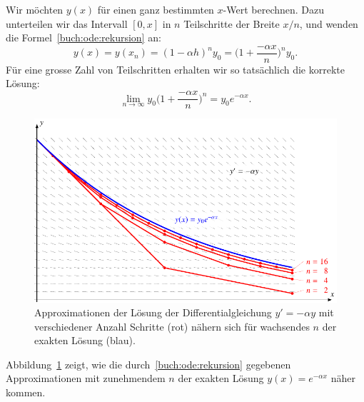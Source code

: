 Wir möchten $y(x)$ für einen ganz bestimmten $x$-Wert berechnen.
Dazu unterteilen wir das Intervall $[0,x]$ in $n$ Teilschritte der
Breite $x/n$, und wenden die Formel~\eqref{buch:ode:rekursion} an:
\[
y(x)=y(x_n)=(1-\alpha h)^n y_0=\biggl(1+\frac{-\alpha x}{n}\biggr)^n y_0.
\]
Für eine grosse Zahl von Teilschritten erhalten wir so tatsächlich die
korrekte Lösung:
\[
\lim_{n\to\infty}y_0\biggl(1+\frac{-\alpha x}n\biggr)^n=y_0 e^{-\alpha x}.
\]
\begin{figure}
\centering
\includegraphics{chapters/50-ode/figures/euler.pdf}
\caption{Approximationen der Lösung der Differentialgleichung $y'=-\alpha y$
mit verschiedener Anzahl Schritte (rot) nähern sich für wachsendes
$n$ der exakten Lösung (blau).
\label{buch:ode:approximation}}
\end{figure}%
Abbildung~\ref{buch:ode:approximation} zeigt, wie die
durch~\eqref{buch:ode:rekursion} gegebenen Approximationen mit zunehmendem
$n$ der exakten Lösung $y(x)=e^{-\alpha x}$ näher kommen.


